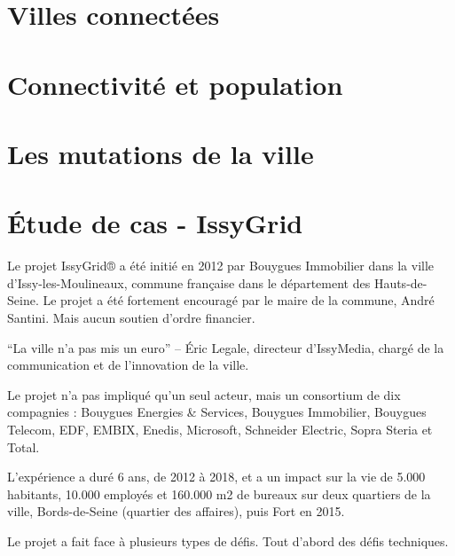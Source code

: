 
\section{Villes connectées}

\section{Connectivité et population}

\section{Les mutations de la ville}



\section{Étude de cas - IssyGrid}
Le projet IssyGrid® a été initié en 2012 par Bouygues Immobilier dans la ville d'Issy-les-Moulineaux,
commune française dans le département des Hauts-de-Seine. Le projet a été fortement encouragé par le 
maire de la commune, André Santini. Mais aucun soutien d'ordre financier.

``La ville n’a pas mis un euro'' --  Éric Legale, directeur d’IssyMedia, chargé de la communication et 
de l’innovation de la ville.

Le projet n'a pas impliqué qu'un seul acteur, mais un consortium de dix compagnies : 
Bouygues Energies \& Services, Bouygues Immobilier, Bouygues Telecom, EDF, EMBIX, Enedis, 
Microsoft, Schneider Electric, Sopra Steria et Total.

L'expérience a duré 6 ans, de 2012 à 2018, et a un impact sur la vie de 5.000 habitants, 10.000 employés 
et 160.000 m2 de bureaux sur deux quartiers de la ville, Bords-de-Seine (quartier des affaires), 
puis Fort en 2015.

Le projet a fait face à plusieurs types de défis. Tout d'abord des défis techniques. 

